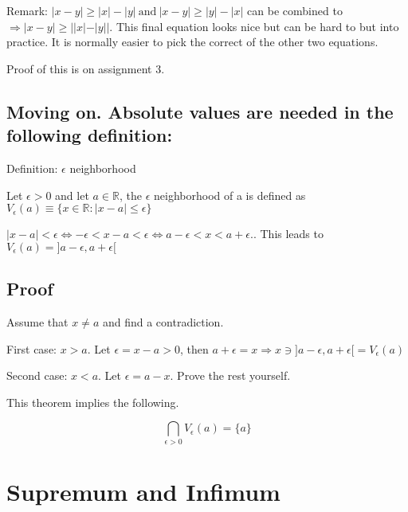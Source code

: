\documentclass{article}
\begin{document}
Remark:
$|x - y| \geq |x| - |y| \ \text{and} \ |x - y| \geq |y| - |x|$ can be combined to $\Rightarrow |x - y| \geq ||x| - |y||$. This final equation looks nice but can be hard to but into practice. It is normally easier to pick the correct of the other two equations.

Proof of this is on assignment 3.

\subsection{Moving on. Absolute values are needed in the following definition:}

Definition: $\epsilon$ neighborhood

Let $\epsilon > 0$ and let $a \in \mathbb{R}$, the $\epsilon$ neighborhood of a is defined as $V_\epsilon (a) \equiv \{x \in \mathbb{R}: |x - a| \le \epsilon\}$

$|x - a| < \epsilon \Leftrightarrow -\epsilon < x - a < \epsilon \Leftrightarrow a - \epsilon < x < a + \epsilon.$. This leads to $V_\epsilon (a) = ]a - \epsilon, a + \epsilon[$


\subsection{Proof}

Assume that $x \neq a$ and find a contradiction.

First case: $x > a$. Let $\epsilon = x - a > 0$, then $a + \epsilon = x \Rightarrow x \ni ]a - \epsilon, a + \epsilon[ = V_\epsilon(a)$

Second case:  $x < a$. Let $\epsilon = a - x$. Prove the rest yourself.

This theorem implies the following. 

$$ \bigcap_{\epsilon > 0} V_\epsilon (a) = \{a\} $$

\section{Supremum and Infimum}
\end{document}
